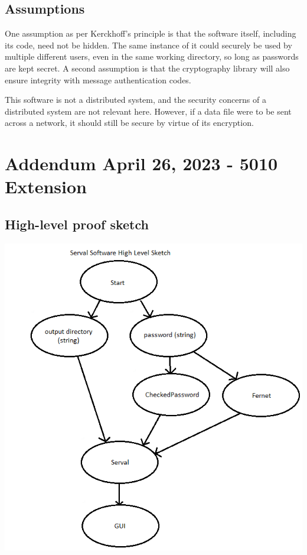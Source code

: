 \documentclass[12pt, letterpaper]{article}
\begin{document}
\subsection{Assumptions}
One assumption as per Kerckhoff's principle is that the software itself, including its code, need not be hidden. The same instance of it could securely be used by multiple different users, even in the same working directory, so long as passwords are kept secret. A second assumption is that the cryptography library will also ensure integrity with message authentication codes.

This software is not a distributed system, and the security concerns of a distributed system are not relevant here. However, if a data file were to be sent across a network, it should still be secure by virtue of its encryption.

\section{Addendum April 26, 2023 - 5010 Extension}

\subsection{High-level proof sketch}

\includegraphics[scale=0.6]{High_Level_Proof_Sketch.png}
\end{document}
